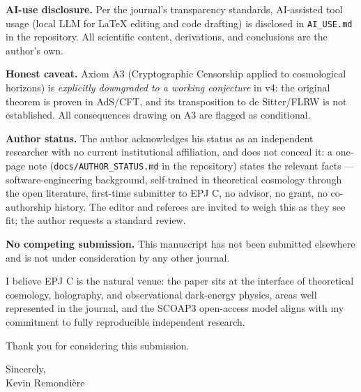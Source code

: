\documentclass[11pt,a4paper]{article}
\begin{document}
\textbf{AI-use disclosure.} Per the journal's transparency standards, AI-assisted tool usage (local LLM for LaTeX editing and code drafting) is disclosed in \texttt{AI\_USE.md} in the repository. All scientific content, derivations, and conclusions are the author's own.

\textbf{Honest caveat.} Axiom A3 (Cryptographic Censorship applied to cosmological horizons) is \emph{explicitly downgraded to a working conjecture} in v4: the original theorem is proven in AdS/CFT, and its transposition to de Sitter/FLRW is not established. All consequences drawing on A3 are flagged as conditional.

\textbf{Author status.} The author acknowledges his status as an independent researcher with no current institutional affiliation, and does not conceal it: a one-page note (\texttt{docs/AUTHOR\_STATUS.md} in the repository) states the relevant facts --- software-engineering background, self-trained in theoretical cosmology through the open literature, first-time submitter to EPJ C, no advisor, no grant, no co-authorship history. The editor and referees are invited to weigh this as they see fit; the author requests a standard review.

\textbf{No competing submission.} This manuscript has not been submitted elsewhere and is not under consideration by any other journal.

I believe EPJ C is the natural venue: the paper sits at the interface of theoretical cosmology, holography, and observational dark-energy physics, areas well represented in the journal, and the SCOAP3 open-access model aligns with my commitment to fully reproducible independent research.

Thank you for considering this submission.

\vspace{1em}
\noindent Sincerely, \\
Kevin Remondi\`ere
\end{document}
